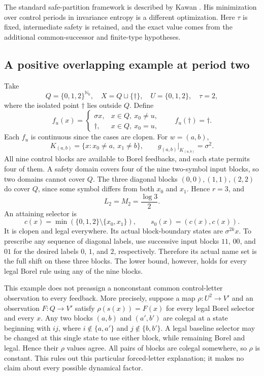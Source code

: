 \documentclass[11pt,reqno]{amsart}
\numberwithin{equation}{section}
\theoremstyle{definition}
\theoremstyle{remark}
\newcommand{\Nzero}{\mathbb N_0}
\begin{document}
The standard safe-partition framework is described by Kawan
\cite[Chapter~2]{Kawan2013}. His minimization over control periods in
invariance entropy is a different optimization. Here $\tau$ is fixed,
intermediate safety is retained, and the exact value comes from the
additional common-successor and finite-type hypotheses.

\subsection{A positive overlapping example at period two}

Take
\[
 Q=\{0,1,2\}^{\Nzero},\quad X=Q\sqcup\{\dagger\},\quad
 U=\{0,1,2\},\quad\tau=2,
\]
where the isolated point $\dagger$ lies outside $Q$. Define
\[
 f_u(x)=
 \begin{cases}\sigma x,&x\in Q,\ x_0\ne u,\\
 \dagger,&x\in Q,\ x_0=u,\end{cases}
 \qquad f_u(\dagger)=\dagger.
\]
Each $f_u$ is continuous since the cases are clopen. For $w=(a,b)$,
\[
 K_{(a,b)}=\{x:x_0\ne a,\ x_1\ne b\},\qquad
 g_{(a,b)}|_{K_{(a,b)}}=\sigma^2.
\]
All nine control blocks are available to Borel feedbacks, and each
state permits four of them. A safety domain covers four of the nine
two-symbol input blocks, so two domains cannot cover $Q$. The three
diagonal blocks $(0,0),(1,1),(2,2)$ do cover $Q$, since some symbol
differs from both $x_0$ and $x_1$. Hence $r=3$, and
\[
 L_2=M_2=\frac{\log3}{2}.
\]
An attaining selector is
\[
 c(x)=\min(\{0,1,2\}\setminus\{x_0,x_1\}),\qquad
 s_0(x)=(c(x),c(x)).
\]
It is clopen and legal everywhere. Its actual block-boundary states
are $\sigma^{2k}x$. To prescribe any sequence of diagonal labels, use
successive input blocks $11$, $00$, and $01$ for the desired labels
$0$, $1$, and $2$, respectively. Therefore its actual name set is the
full shift on these three blocks. The lower bound, however, holds for
every legal Borel rule using any of the nine blocks.

This example does not preassign a nonconstant common control-letter
observation to every feedback. More precisely, suppose a map
$\rho:U^2\to V'$ and an observation $F:Q\to V'$ satisfy
$\rho(s(x))=F(x)$ for every legal Borel selector and every $x$.
Any two blocks $(a,b)$ and $(a',b')$ are colegal at a state beginning
with $ij$, where $i\notin\{a,a'\}$ and $j\notin\{b,b'\}$.
A legal baseline selector may be changed at this single state to use
either block, while remaining Borel and legal. Hence their $\rho$
values agree. All pairs of blocks are colegal somewhere, so $\rho$
is constant. This rules out this particular forced-letter explanation;
it makes no claim about every possible dynamical factor.
\end{document}
